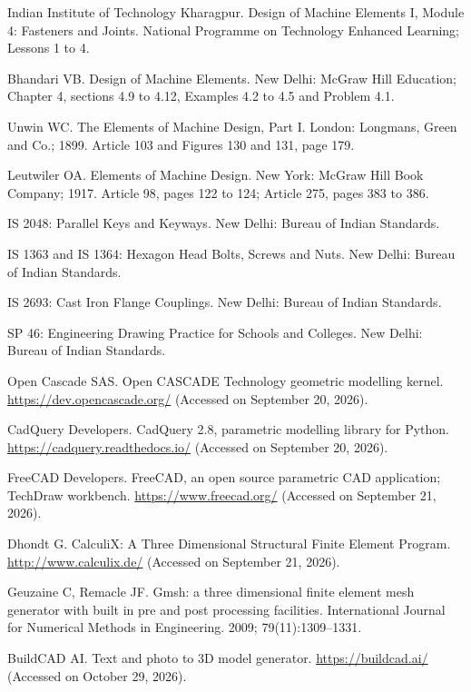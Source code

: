\item[{[1]}] Indian Institute of Technology Kharagpur. Design of Machine Elements I, Module 4: Fasteners and Joints. National Programme on Technology Enhanced Learning; Lessons 1 to 4.
\item[{[2]}] Bhandari VB. Design of Machine Elements. New Delhi: McGraw Hill Education; Chapter 4, sections 4.9 to 4.12, Examples 4.2 to 4.5 and Problem 4.1.
\item[{[3]}] Unwin WC. The Elements of Machine Design, Part I. London: Longmans, Green and Co.; 1899. Article 103 and Figures 130 and 131, page 179.
\item[{[4]}] Leutwiler OA. Elements of Machine Design. New York: McGraw Hill Book Company; 1917. Article 98, pages 122 to 124; Article 275, pages 383 to 386.
\item[{[5]}] IS 2048: Parallel Keys and Keyways. New Delhi: Bureau of Indian Standards.
\item[{[6]}] IS 1363 and IS 1364: Hexagon Head Bolts, Screws and Nuts. New Delhi: Bureau of Indian Standards.
\item[{[7]}] IS 2693: Cast Iron Flange Couplings. New Delhi: Bureau of Indian Standards.
\item[{[8]}] SP 46: Engineering Drawing Practice for Schools and Colleges. New Delhi: Bureau of Indian Standards.
\item[{[9]}] Open Cascade SAS. Open CASCADE Technology geometric modelling kernel. \url{https://dev.opencascade.org/} (Accessed on September 20, 2026).
\item[{[10]}] CadQuery Developers. CadQuery 2.8, parametric modelling library for Python. \url{https://cadquery.readthedocs.io/} (Accessed on September 20, 2026).
\item[{[11]}] FreeCAD Developers. FreeCAD, an open source parametric CAD application; TechDraw workbench. \url{https://www.freecad.org/} (Accessed on September 21, 2026).
\item[{[12]}] Dhondt G. CalculiX: A Three Dimensional Structural Finite Element Program. \url{http://www.calculix.de/} (Accessed on September 21, 2026).
\item[{[13]}] Geuzaine C, Remacle JF. Gmsh: a three dimensional finite element mesh generator with built in pre and post processing facilities. International Journal for Numerical Methods in Engineering. 2009; 79(11):1309--1331.
\item[{[14]}] BuildCAD AI. Text and photo to 3D model generator. \url{https://buildcad.ai/} (Accessed on October 29, 2026).
